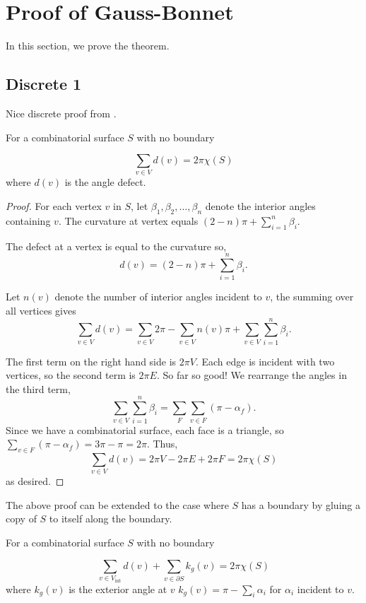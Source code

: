 \section{Proof of Gauss-Bonnet}
\label{sec:proof}


In this section, we prove the theorem.

\subsection{Discrete 1}
Nice discrete proof from \cite{upadhyay2015}.



\begin{theorem}\label{thm:g-b-discete-bdy}
For a combinatorial surface $S$ with no boundary

$$\sum_{v\in V} d(v)=2\pi \chi(S)$$
where $d(v)$ is the angle defect.
\end{theorem}

\begin{proof}

For each vertex $v$ in $S$,
let $\beta_1,\beta_2,\ldots,\beta_n$ denote the interior angles
containing $v$.
The curvature at vertex equals $(2-n)\pi +\sum_{i=1}^n \beta_i$.

The defect  at a vertex is equal to the curvature so,
 $$d(v)=(2-n)\pi +\sum_{i=1}^n \beta_i.$$

Let $n(v)$ denote the number of interior angles incident to $v$, the summing over all vertices gives
$$\sum_{v\in V} d(v)=\sum_{v\in V}2\pi - \sum_{v\in V}n(v)\pi+\sum_{v\in V}\sum_{i=1}^n \beta_i.$$

The first term on the right hand side is $2\pi V$. Each edge is incident with two vertices, so the second
term is $2\pi E$. So far so good!
We rearrange the angles in the third term,
$$ \sum_{v\in V}\sum_{i=1}^n \beta_i=\sum_F\sum_{v\in F}(\pi-\alpha_f).$$
Since we have a combinatorial surface, each face is a triangle,
so $\sum_{v\in F}(\pi-\alpha_f)=3\pi-\pi=2\pi.$
Thus, $$\sum_{v\in V} d(v)=2\pi V-2\pi E+2\pi F=2\pi \chi(S)$$ as desired.
\end{proof}

The above proof can be extended to the case where $S$ has a boundary
by gluing a copy of $S$ to itself along the boundary.

\begin{theorem}\label{thm:g-b-discete}
For a combinatorial surface $S$ with no boundary

$$\sum_{v\in V_{\text{int}}} d(v)+\sum_{v\in\partial S}k_g(v)=2\pi \chi(S)$$
where $k_g(v)$ is the exterior angle at $v$ 
$k_g(v)=\pi-\sum_i\alpha_i$ for $\alpha_i$ incident to $v$.
\end{theorem}

